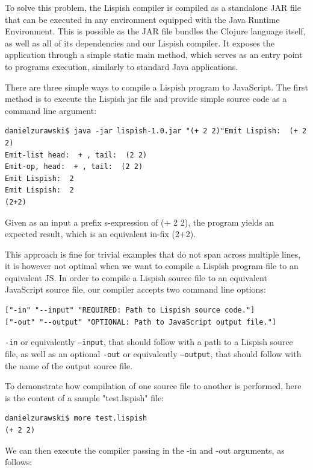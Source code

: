 To solve this problem, the Lispish compiler is compiled as a standalone JAR file that can be executed in any environment equipped with the Java Runtime Environment. This is possible as the JAR file bundles the Clojure language itself, as well as all of its dependencies and our Lispish compiler. It exposes the application through a simple static main method, which serves as an entry point to programs execution, similarly to standard Java applications. 

There are three simple ways to compile a Lispish program to JavaScript. The first method is to execute the Lispish jar file and provide simple source code as a command line argument:

\begin{verbatim}
danielzurawski$ java -jar lispish-1.0.jar "(+ 2 2)"Emit Lispish:  (+ 2 2)
Emit-list head:  + , tail:  (2 2)
Emit-op, head:  + , tail:  (2 2)
Emit Lispish:  2
Emit Lispish:  2
(2+2)
\end{verbatim}

Given as an input a prefix s-expression of (+ 2 2), the program yields an expected result, which is an equivalent in-fix (2+2).

This approach is fine for trivial examples that do not span across multiple lines, it is however not optimal when we want to compile a Lispish program file to an equivalent JS. 
In order to compile a Lispish source file to an equivalent JavaScript source file, our compiler accepts two command line options:

\begin{verbatim}
["-in" "--input" "REQUIRED: Path to Lispish source code."]
["-out" "--output" "OPTIONAL: Path to JavaScript output file."]
\end{verbatim}

\texttt{-in} or equivalently  \texttt{--input}, that should follow with a path to a Lispish source file, as well as an optional 
\texttt{-out} or equivalently \texttt{--output}, that should follow with the name of the output source file. 

To demonstrate how compilation of one source file to another is performed, here is the content of a sample "test.lispish" file:

\begin{verbatim}
danielzurawski$ more test.lispish
(+ 2 2)
\end{verbatim}

We can then execute the compiler passing in the -in and -out arguments, as follows:


